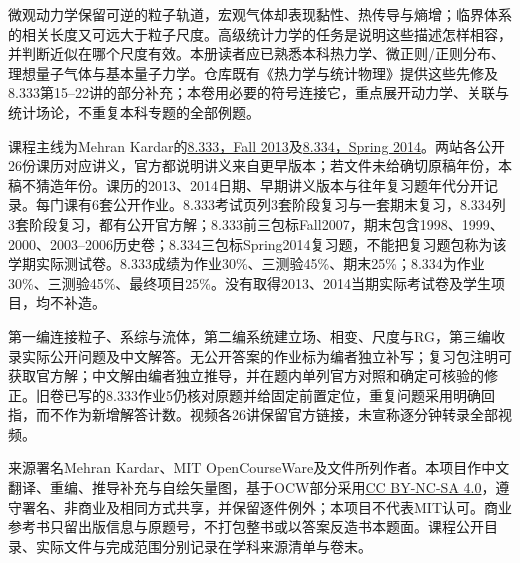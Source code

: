 \originalpreface
微观动力学保留可逆的粒子轨道，宏观气体却表现黏性、热传导与熵增；临界体系的相关长度又可远大于粒子尺度。高级统计力学的任务是说明这些描述怎样相容，并判断近似在哪个尺度有效。本册读者应已熟悉本科热力学、微正则/正则分布、理想量子气体与基本量子力学。仓库既有《热力学与统计物理》提供这些先修及8.333第15--22讲的部分补充；本卷用必要的符号连接它，重点展开动力学、关联与统计场论，不重复本科专题的全部例题。

课程主线为Mehran Kardar的\href{https://ocw.mit.edu/courses/8-333-statistical-mechanics-i-statistical-mechanics-of-particles-fall-2013/}{8.333，Fall 2013}及\href{https://ocw.mit.edu/courses/8-334-statistical-mechanics-ii-statistical-physics-of-fields-spring-2014/}{8.334，Spring 2014}。两站各公开26份课历对应讲义，官方都说明讲义来自更早版本；若文件未给确切原稿年份，本稿不猜造年份。课历的2013、2014日期、早期讲义版本与往年复习题年代分开记录。每门课有6套公开作业。8.333考试页列3套阶段复习与一套期末复习，8.334列3套阶段复习，都有公开官方解；8.333前三包标Fall2007，期末包含1998、1999、2000、2003--2006历史卷；8.334三包标Spring2014复习题，不能把复习题包称为该学期实际测试卷。8.333成绩为作业30\%、三测验45\%、期末25\%；8.334为作业30\%、三测验45\%、最终项目25\%。没有取得2013、2014当期实际考试卷及学生项目，均不补造。

第一编连接粒子、系综与流体，第二编系统建立场、相变、尺度与RG，第三编收录实际公开问题及中文解答。无公开答案的作业标为编者独立补写；复习包注明可获取官方解；中文解由编者独立推导，并在题内单列官方对照和确定可核验的修正。旧卷已写的8.333作业5仍核对原题并给固定前置定位，重复问题采用明确回指，而不作为新增解答计数。视频各26讲保留官方链接，未宣称逐分钟转录全部视频。

来源署名Mehran Kardar、MIT OpenCourseWare及文件所列作者。本项目作中文翻译、重编、推导补充与自绘矢量图，基于OCW部分采用\href{https://creativecommons.org/licenses/by-nc-sa/4.0/}{CC BY-NC-SA 4.0}，遵守署名、非商业及相同方式共享，并保留逐件例外；本项目不代表MIT认可。商业参考书只留出版信息与原题号，不打包整书或以答案反造书本题面。课程公开目录、实际文件与完成范围分别记录在学科来源清单与卷末。
